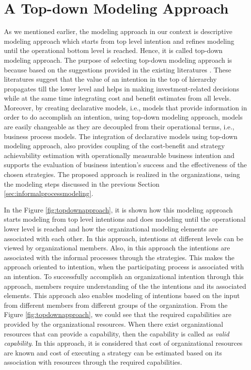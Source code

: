 \section{A Top-down Modeling Approach}
\label{sec:topdownapproach}
As we mentioned earlier, the modeling approach in our context is descriptive modeling approach which starts from top level intention and refines modeling until the operational bottom level is reached. Hence, it is called top-down modeling approach. The purpose of selecting top-down modeling approach is because based on the suggestions provided in the existing literatures \cite{Mandic2010, Bider2005,Sungur2016}. These literatures suggest that the value of an intention in the top of hierarchy propagates till the lower level and helps in making investment-related decisions while at the same time integrating cost and benefit estimates from all levels. Moreover, by creating declarative models, i.e., models that provide information in order to do accomplish an intention, using top-down modeling approach, models are easily changeable as they are decoupled from their operational terms, i.e., business process models. The integration of declarative models using top-down modeling approach, also provides coupling of the cost-benefit and strategy achievability estimation with operationally measurable business intention and supports the evaluation of business intention's success and the effectiveness of the chosen strategies. The proposed approach is realized in the organizations, using the modeling steps discussed in the previous Section \ref{sec:informalprocessmodeling}. 


In the Figure \ref{fig:topdownapproach}, it is shown how this modeling approach starts modeling from top level intentions and does modeling until the operational lower level is reached and how the organizational modeling elements are associated with each other. In this approach, intentions at different levels can be viewed by organizational members. Also, in this approach the intentions are associated with the informal processes through the strategies. This makes the approach oriented to intention, when the participating process is associated with an intention. To successfully accomplish an organizational intention through this approach, members require understanding of the the intentions and its associated elements. This approach also enables modeling of intentions based on the input from different members from different groups of the organization. From the Figure \ref{fig:topdownapproach}, we could see that the required capabilities are provided by the organizational resources. When there exist organizational resources that can provide a capability, then the capability is called as \textit{valid capability}. In this approach, it is considered that cost of organizational resources are known and cost of executing a strategy can be estimated based on its association with resources through the required capabilities. 


